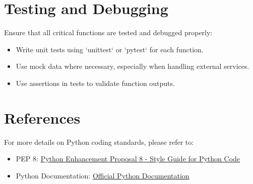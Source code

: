 \documentclass[11pt,a4paper]{article}
\begin{document}
\section*{Testing and Debugging}
Ensure that all critical functions are tested and debugged properly:
\begin{itemize}
    \item Write unit tests using `unittest` or `pytest` for each function.
    \item Use mock data where necessary, especially when handling external services.
    \item Use assertions in tests to validate function outputs.
\end{itemize}

\section*{References}
For more details on Python coding standards, please refer to:
\begin{itemize}
    \item PEP 8: \href{https://www.python.org/dev/peps/pep-0008/}{Python Enhancement Proposal 8 - Style Guide for Python Code}
    \item Python Documentation: \href{https://docs.python.org/3/}{Official Python Documentation}
\end{itemize}
\end{document}
